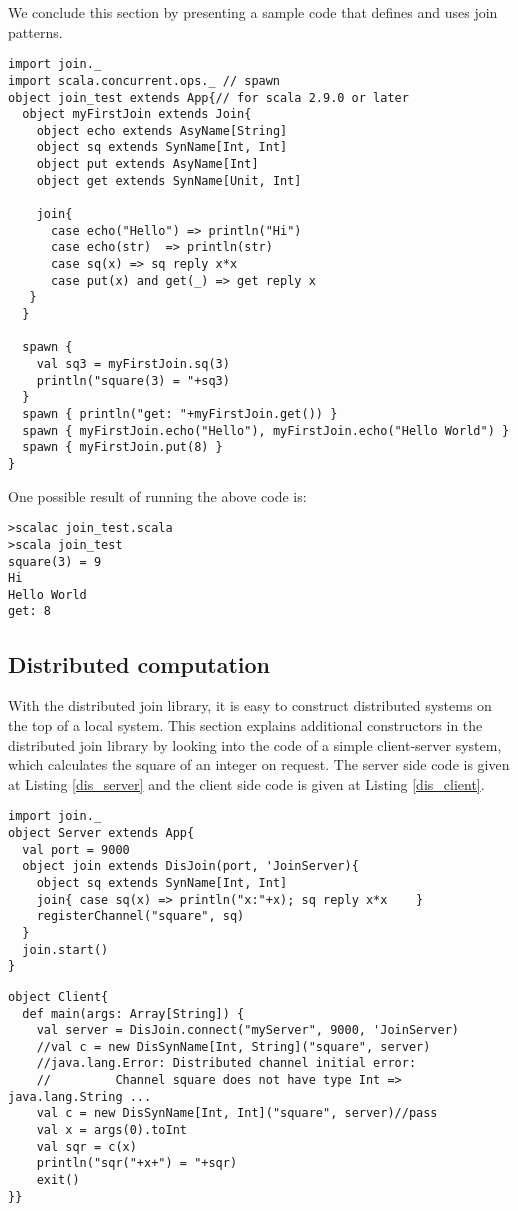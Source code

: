 We conclude this section by presenting a sample code that defines and uses join patterns.

\begin{lstlisting}[label=local_join_def_example, caption=Example code for defining join patterns (join\_test.scala)]
import join._
import scala.concurrent.ops._ // spawn
object join_test extends App{// for scala 2.9.0 or later
  object myFirstJoin extends Join{
    object echo extends AsyName[String]
    object sq extends SynName[Int, Int]
    object put extends AsyName[Int]
    object get extends SynName[Unit, Int]

    join{
      case echo("Hello") => println("Hi")
      case echo(str)  => println(str)
      case sq(x) => sq reply x*x
      case put(x) and get(_) => get reply x
   }
  }

  spawn {
    val sq3 = myFirstJoin.sq(3)
    println("square(3) = "+sq3)
  }
  spawn { println("get: "+myFirstJoin.get()) }
  spawn { myFirstJoin.echo("Hello"), myFirstJoin.echo("Hello World") }
  spawn { myFirstJoin.put(8) }
}
\end{lstlisting}
One possible result of running the above code is:
\begin{lstlisting}
>scalac join_test.scala
>scala join_test
square(3) = 9
Hi
Hello World
get: 8
\end{lstlisting}



\subsection{Distributed computation}


With the distributed join library, it is easy to construct distributed systems on the top of a local system.  This section explains additional constructors in the distributed join library by looking into the code of a simple client-server system, which calculates the square of an integer on request.  The server side code is given at Listing \ref{dis_server} and the client side code is given at Listing \ref{dis_client}.

\newpage

\begin{lstlisting}[label=dis_server, caption=Server.scala]
import join._
object Server extends App{
  val port = 9000
  object join extends DisJoin(port, 'JoinServer){
    object sq extends SynName[Int, Int]
    join{ case sq(x) => println("x:"+x); sq reply x*x    }
    registerChannel("square", sq)
  }
  join.start()
}
\end{lstlisting}
\begin{lstlisting}[label=dis_client, caption=Client.scala]
object Client{
  def main(args: Array[String]) {
    val server = DisJoin.connect("myServer", 9000, 'JoinServer)
    //val c = new DisSynName[Int, String]("square", server)
    //java.lang.Error: Distributed channel initial error: 
    //         Channel square does not have type Int => java.lang.String ...
    val c = new DisSynName[Int, Int]("square", server)//pass
    val x = args(0).toInt
    val sqr = c(x)
    println("sqr("+x+") = "+sqr)
    exit()
}}
\end{lstlisting}

